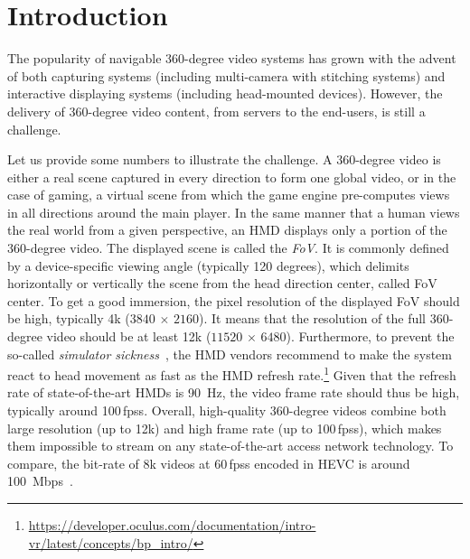 \section{Introduction}
\label{sec:introduction}


The popularity of navigable 360-degree video systems
has grown with the advent of both capturing systems
(including multi-camera with stitching systems) and interactive displaying
systems (including head-mounted devices).
However, the delivery of 360-degree video content, from servers
to the end-users,
is still a challenge.

Let us provide some numbers to illustrate the challenge.
A 360-degree video is either a real scene captured in every direction
to form one global video, or in the case of gaming, a virtual scene from which the
game engine pre-computes views in all directions around the main player.
In the same manner that a human
views the real world from a given perspective, an \ac{HMD} displays only a portion
of the 360-degree video. The displayed scene is called the \textit{\ac{FoV}}. It is commonly
defined by 
a device-specific viewing angle (typically 120 degrees), which delimits horizontally or 
vertically the scene from the head direction center, called \ac{FoV} center. To get a good 
immersion, the pixel 
resolution of
the displayed \ac{FoV} should be high, typically 4k ($3840\,\times\,2160$). It means that
the resolution of the full 360-degree video should be at least 12k ($11520\,\times\,6480$). 
Furthermore, to prevent the so-called \emph{simulator sickness}~\cite{moss2011characteristics}, the \ac{HMD} 
vendors recommend to make the system react to head movement as fast as the \ac{HMD}
refresh rate.\footnote{\url{https://developer.oculus.com/documentation/intro-vr/latest/concepts/bp_intro/}} Given that the refresh rate of 
state-of-the-art \acp{HMD} is \SI{90}{Hz}, the video frame rate should thus be high,
typically around 100\,\acp{fps}.
Overall, high-quality 360-degree videos combine both large resolution (up to 12k) and high
frame rate (up to 100\,\acp{fps}), which makes them impossible to stream on any
state-of-the-art access network technology. To compare, the bit-rate of 8k videos 
at 60\,\acp{fps} encoded in \ac{HEVC} is around \SI{100}{Mbps}~\cite{7398367}.

